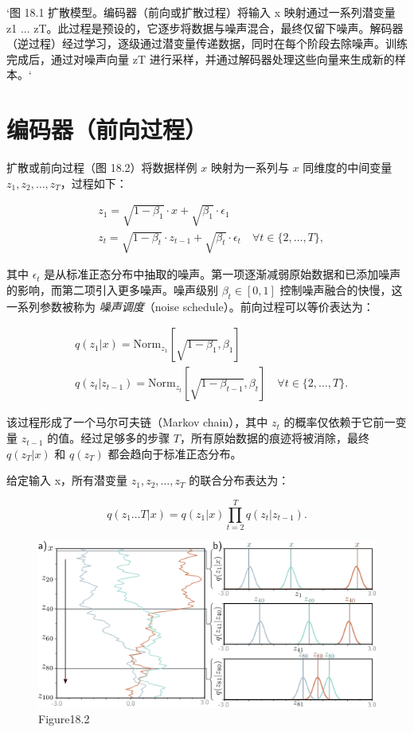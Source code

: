 `图 18.1 扩散模型。编码器（前向或扩散过程）将输入 x 映射通过一系列潜变量 z1 ... zT。此过程是预设的，它逐步将数据与噪声混合，最终仅留下噪声。解码器（逆过程）经过学习，逐级通过潜变量传递数据，同时在每个阶段去除噪声。训练完成后，通过对噪声向量 zT 进行采样，并通过解码器处理这些向量来生成新的样本。`

\section{编码器（前向过程）}

扩散或前向过程（图 18.2）将数据样例 \( x \) 映射为一系列与 \( x \) 同维度的中间变量 \( z_1, z_2, \ldots, z_T \)，过程如下：

\begin{align}
&z_1 = \sqrt{1 - \beta_1} \cdot x + \sqrt{\beta_1} \cdot \epsilon_1 \\
&z_t = \sqrt{1 - \beta_t} \cdot z_{t-1} + \sqrt{\beta_t} \cdot \epsilon_t \quad \forall t \in \{2, \ldots, T\}, 
\end{align} 

其中 \( \epsilon_t \) 是从标准正态分布中抽取的噪声。第一项逐渐减弱原始数据和已添加噪声的影响，而第二项引入更多噪声。噪声级别 \( \beta_t \in [0, 1] \) 控制噪声融合的快慢，这一系列参数被称为 \textit{噪声调度}（noise schedule）。前向过程可以等价表达为：



\begin{align}
&q(z_1|x) = \text{Norm}_{z_1} \left[ \sqrt{1 - \beta_1}, \beta_1 \right] \\
&q(z_t|z_{t-1}) = \text{Norm}_{z_t} \left[ \sqrt{1 - \beta_{t-1}}, \beta_t \right] \quad \forall t \in \{2, \ldots, T\}. 
\end{align} 


该过程形成了一个马尔可夫链（Markov chain），其中 \(z_t\) 的概率仅依赖于它前一变量 \(z_{t-1}\) 的值。经过足够多的步骤 \(T\)，所有原始数据的痕迹将被消除，最终 \(q(z_T|x)\) 和 \(q(z_T)\) 都会趋向于标准正态分布。

给定输入 x，所有潜变量 \(z_1, z_2, \ldots, z_T\) 的联合分布表达为：

\begin{equation}
q(z_1\ldots T|x) = q(z_1|x) \prod_{t=2}^{T} q(z_t|z_{t-1}). 
\end{equation}


\begin{figure}[ht!]
\centering
\includegraphics[width=0.7\linewidth]{png/chapter18/DiffusionForward2.png}
\caption{Figure18.2}
\end{figure}


